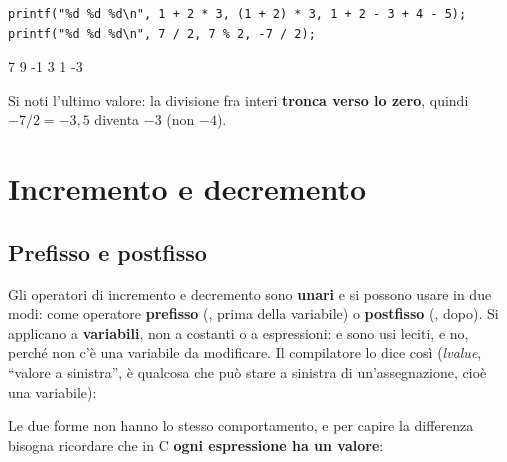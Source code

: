 \begin{affianco}[0.62][c]
\begin{lstlisting}[style=c]
printf("%d %d %d\n", 1 + 2 * 3, (1 + 2) * 3, 1 + 2 - 3 + 4 - 5);
printf("%d %d %d\n", 7 / 2, 7 % 2, -7 / 2);
\end{lstlisting}
\risultato
\begin{console}
7 9 -1
3 1 -3
\end{console}
\end{affianco}

Si noti l'ultimo valore: la divisione fra interi \textbf{tronca verso lo
zero}, quindi $-7/2 = -3{,}5$ diventa $-3$ (non $-4$).


\section{Incremento e decremento}

\subsection{Prefisso e postfisso}

Gli operatori di incremento \code{++} e decremento \code{-{}-} sono
\textbf{unari} e si possono usare in due modi: come operatore
\textbf{prefisso} (, prima della variabile) o \textbf{postfisso}
(, dopo). Si applicano a \textbf{variabili}, non a costanti o a
espressioni:  e  sono usi leciti,  e
 no, perché non c'è una variabile da modificare. Il
compilatore lo dice così (\textit{lvalue}, “valore a sinistra”, è
qualcosa che può stare a sinistra di un'assegnazione, cioè una variabile):


Le due forme non hanno lo stesso comportamento, e per capire la differenza
bisogna ricordare che in C \textbf{ogni espressione ha un valore}:

